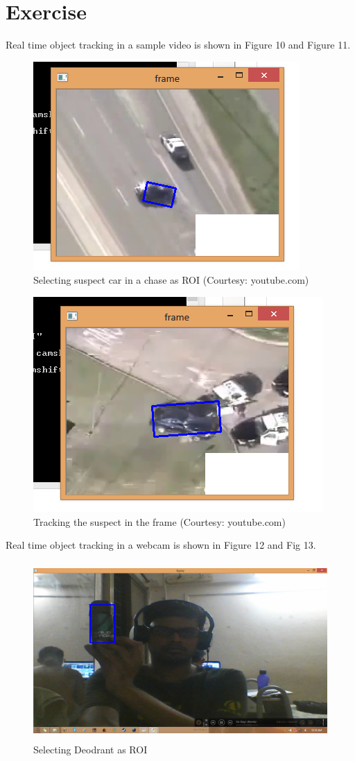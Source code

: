\documentclass[11pt,a4paper]{article}
\begin{document}
	\section{Exercise}
		Real time object tracking in a sample video is shown in Figure 10 and Figure 11.          
		\begin{figure}[h!]
			\includegraphics[scale=1.1]{../Images/Vid_ROI.png}
			\centering
			\caption{Selecting suspect car in a chase as ROI (Courtesy: youtube.com)}
		\end{figure}
		\begin{figure}[h!]
			 \includegraphics[scale=1.1]{../Images/Vid_Det.png}
			 \centering
			 \caption{Tracking the suspect in the frame (Courtesy: youtube.com)}
		\end{figure}
		\newpage
		Real time object tracking in a webcam is shown in Figure 12 and Fig 13.  
		\begin{figure}[h!]
			\includegraphics[width=0.9\linewidth, height=6.8cm]{../Images/Cam_ROI.png}
			\centering
			\caption{Selecting Deodrant as ROI}
		\end{figure}
\end{document}
